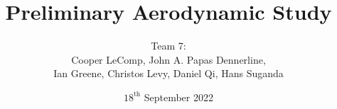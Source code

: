 \title{Preliminary Aerodynamic Study}
\author{Team 7:
\\Cooper LeComp, John A. Papas Dennerline, 
\\Ian Greene, Christos Levy, Daniel Qi, Hans Suganda}
\date{$18^{\text{th}}$ September 2022}
